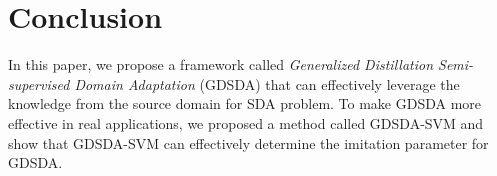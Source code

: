 \documentclass{llncs}
\begin{document}
\section{Conclusion}\label{sec:con}
In this paper, we propose a framework called \textit{Generalized Distillation Semi-supervised Domain Adaptation} (GDSDA) that can effectively leverage the knowledge from the source domain for SDA problem. To make GDSDA more effective in real applications, we proposed a method called GDSDA-SVM and show that GDSDA-SVM can effectively determine the imitation parameter for GDSDA.







\end{document}
